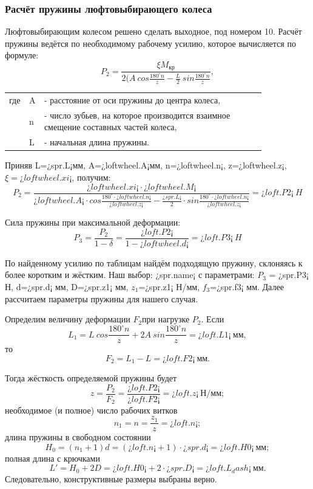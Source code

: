 \documentclass[14pt,a4paper,russian]{scrartcl}
\begin{document}
    \subsubsection{Расчёт пружины люфтовыбирающего колеса}
        Люфтовыбирающим колесом решено сделать выходное, под номером 10.
        Расчёт пружины ведётся по необходимому рабочему усилию, которое
        вычисляется по формуле:
        \[ P_2 = \frac{\xi M_{\text{кр}}}{2(A\ cos\frac{180^\circ n}{z}
                - \frac{L}{2}\ sin\frac{180^\circ n}{z}},\]
        \begin{table}[h!]
            \begin{center}
                \begin{tabular}{p{0.025\linewidth}p{0.01\linewidth}p{0.8\linewidth}}
                    где & A & - расстояние от оси пружины до центра колеса,\\
                    & n & - число зубьев, на которое производится взаимное смещение составных частей колеса,\\
                    & L & - начальная длина пружины.
                \end{tabular}
            \end{center}
        \end{table}

        Приняв L=¿spr.L¡мм, A=¿loftwheel.A¡мм, n=¿loftwheel.n¡, 
        z=¿loftwheel.z¡, \( \xi=¿loftwheel.xi¡ \), получим:
        \[ P_2 = \frac{¿loftwheel.xi¡\cdot¿loftwheel.M¡}{¿loftwheel.A¡\cdot cos\frac{180^\circ\cdot¿loftwheel.n¡}{¿loftwheel.z¡}
                - \frac{¿spr.L¡}{2}\cdot sin\frac{180^\circ\cdot¿loftwheel.n¡}{¿loftwheel.z¡}} = ¿loft.P2¡\ H\]
        
        Сила пружины при максимальной деформации:
        \[ P_3 = \frac{P_2}{1-\delta} = \frac{¿loft.P2¡}{1-¿loftwheel.d¡} = ¿loft.P3¡\ H\]

        По найденному усилию по таблицам найдём подходящую пружину, склоняясь к более коротким
        и жёстким. Наш выбор: ¿spr.name¡ с параметрами: \( P_3 \) = ¿spr.P3¡ Н, d=¿spr.d¡ мм, 
        D=¿spr.z1¡ мм, \( z_1 \)=¿spr.z1¡ Н/мм, \( f_3 \)=¿spr.f3¡ мм. Далее рассчитаем параметры
        пружины для нашего случая.

        Определим величину деформации \( F_2 \)при нагрузке \( P_2 \). Если 
        \[ L_1 =  L\ cos\frac{180^\circ n}{z} + 2A\ sin\frac{180^\circ n}{z} = ¿loft.L1¡\ \text{мм},\]
        то 
        \[ F_2 = L_1 - L = ¿loft.F2¡\ \text{мм}.\]

        Тогда жёсткость определяемой пружины будет
        \[ z = \frac{P_2}{F_2} = \frac{¿loft.P2¡}{¿loft.F2¡} = ¿loft.z¡\ \text{Н/мм}; \]
        необходимое (и полное) число рабочих витков
        \[ n_1 = n = \frac{z_1}{z} = ¿loft.n¡;\]
        длина пружины в свободном состоянии
        \[ H_0 = (n_1 + 1)d = (¿loft.n¡ + 1)\cdot ¿spr.d¡= ¿loft.H0¡\ \text{мм}; \]
        полная длина с крючками
        \[ L' = H_0 + 2D = ¿loft.H0¡ + 2\cdot ¿spr.D¡ = ¿loft.L_dash¡\ \text{мм}. \]
        Следовательно, конструктивные размеры выбраны верно.
\end{document}
